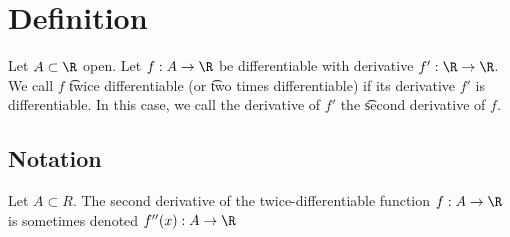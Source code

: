 

\section*{Definition}

Let $A \subset \R $ open.
Let $f: A \to \R $ be differentiable with derivative $f': \R \to \R $.
We call $f$ \t{twice differentiable} (or \t{two times differentiable}) if its derivative $f'$ is differentiable.
In this case, we call the derivative of $f'$ the \t{second derivative} of $f$.

\subsection*{Notation}

Let $A \subset R$.
The second derivative of the twice-differentiable function $f: A \to \R $ is sometimes denoted $f''(x): A \to \R $

\blankpage